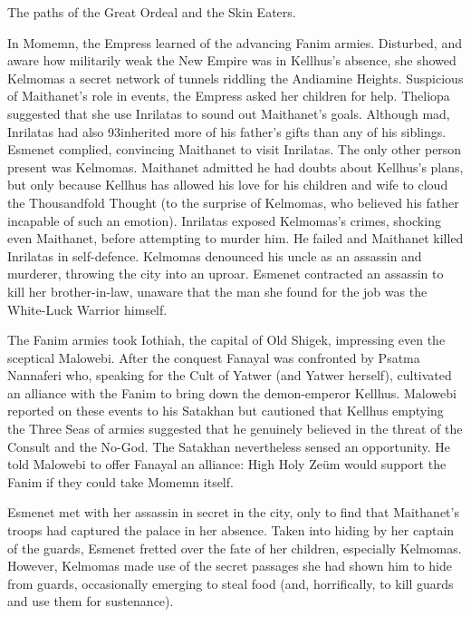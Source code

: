 \documentclass[]{book}
\begin{document}
The paths of the Great Ordeal and the Skin Eaters.

In Momemn, the Empress learned of the advancing Fanim armies. Disturbed, and
aware how militarily weak the New Empire was in Kellhus's absence, she showed
Kelmomas a secret network of tunnels riddling the Andiamine Heights. Suspicious of
Maithanet's role in events, the Empress asked her children for help. Theliopa suggested
that she use Inrilatas to sound out Maithanet's goals. Although mad, Inrilatas had also
93inherited more of his father's gifts than any of his siblings. Esmenet complied,
convincing Maithanet to visit Inrilatas. The only other person present was Kelmomas.
Maithanet admitted he had doubts about Kellhus's plans, but only because Kellhus has
allowed his love for his children and wife to cloud the Thousandfold Thought (to the
surprise of Kelmomas, who believed his father incapable of such an emotion). Inrilatas
exposed Kelmomas's crimes, shocking even Maithanet, before attempting to murder
him. He failed and Maithanet killed Inrilatas in self-defence. Kelmomas denounced his
uncle as an assassin and murderer, throwing the city into an uproar. Esmenet
contracted an assassin to kill her brother-in-law, unaware that the man she found for
the job was the White-Luck Warrior himself.

The Fanim armies took Iothiah, the capital of Old Shigek, impressing even the sceptical
Malowebi. After the conquest Fanayal was confronted by Psatma Nannaferi who,
speaking for the Cult of Yatwer (and Yatwer herself), cultivated an alliance with the
Fanim to bring down the demon-emperor Kellhus. Malowebi reported on these events
to his Satakhan but cautioned that Kellhus emptying the Three Seas of armies
suggested that he genuinely believed in the threat of the Consult and the No-God. The
Satakhan nevertheless sensed an opportunity. He told Malowebi to offer Fanayal an
alliance: High Holy Zeüm would support the Fanim if they could take Momemn itself.

Esmenet met with her assassin in secret in the city, only to find that Maithanet's troops
had captured the palace in her absence. Taken into hiding by her captain of the guards,
Esmenet fretted over the fate of her children, especially Kelmomas. However,
Kelmomas made use of the secret passages she had shown him to hide from guards,
occasionally emerging to steal food (and, horrifically, to kill guards and use them for
sustenance).
\end{document}
